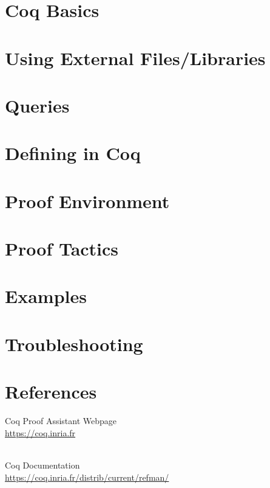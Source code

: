 \documentclass{article}
\begin{document}
\newpage
\section{Coq Basics}
	


\newpage
\section{Using External Files/Libraries}
	


\newpage
\section{Queries}
	


\newpage
\section{Defining in Coq}
	


\newpage
\section{Proof Environment}
	


\newpage
\section{Proof Tactics}
	


\newpage
\section{Examples}
	



\newpage
\section{Troubleshooting}
	



\newpage
\section{References}

Coq Proof Assistant Webpage 		\\
\url{https://coq.inria.fr}

~\\
Coq Documentation \\
\url{https://coq.inria.fr/distrib/current/refman/}
\end{document}
